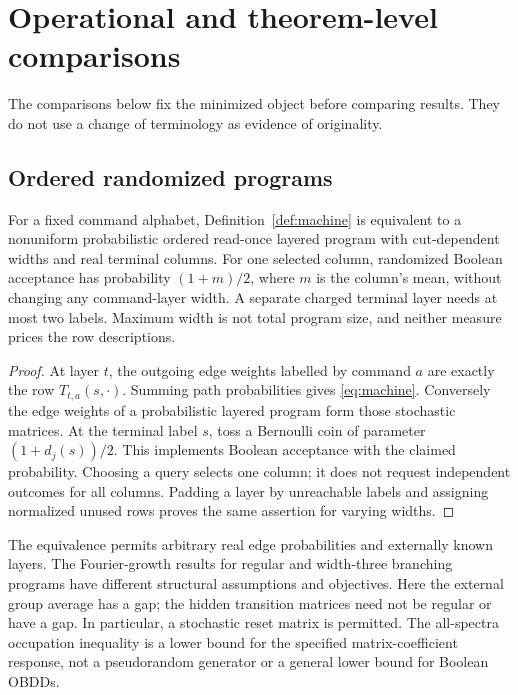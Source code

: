 \section{Operational and theorem-level comparisons}\label{sec:comparison}
The comparisons below fix the minimized object before comparing results.
They do not use a change of terminology as evidence of originality.

\subsection{Ordered randomized programs}
\begin{proposition}\label{prop:program}
For a fixed command alphabet, Definition~\ref{def:machine} is equivalent
to a nonuniform probabilistic ordered read-once layered program with
cut-dependent widths and real terminal columns. For one selected column,
randomized Boolean acceptance has probability $(1+m)/2$, where $m$ is
the column's mean, without changing any command-layer width. A separate
charged terminal layer needs at most two labels. Maximum width is not
total program size, and neither measure prices the row descriptions.
\end{proposition}
\begin{proof}
At layer $t$, the outgoing edge weights labelled by command $a$ are
exactly the row $T_{t,a}(s,\cdot)$. Summing path probabilities gives
\eqref{eq:machine}. Conversely the edge weights of a probabilistic
layered program form those stochastic matrices. At the terminal label
$s$, toss a Bernoulli coin of parameter $(1+d_j(s))/2$. This implements
Boolean acceptance with the claimed probability. Choosing a query selects
one column; it does not request independent outcomes for all columns.
Padding a layer by unreachable labels and assigning normalized unused
rows proves the same assertion for varying widths.
\end{proof}
The equivalence permits arbitrary real edge probabilities and externally
known layers. The Fourier-growth results for regular and width-three
branching programs \cite{RSV,SVW,LPV} have different structural assumptions
and objectives. Here the external group average has a gap; the hidden
transition matrices need not be regular or have a gap. In particular,
a stochastic reset matrix is permitted. The all-spectra occupation
inequality is a lower bound for the specified matrix-coefficient response,
not a pseudorandom generator or a general lower bound for Boolean OBDDs.


